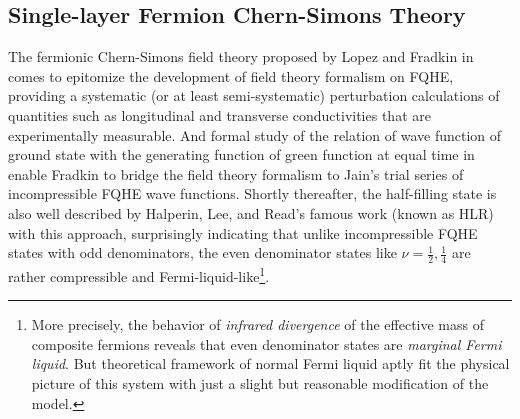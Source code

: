 \documentclass[bachelor,english,numbers]{ustcthesis}
\begin{document}
		\subsection{Single-layer Fermion Chern-Simons Theory}
		\indent\par The fermionic Chern-Simons field theory proposed by Lopez and Fradkin in \cite{lopez1991fractional} comes to epitomize the development of field theory formalism on FQHE, providing a systematic (or at least semi-systematic) perturbation calculations of quantities such as longitudinal and transverse conductivities that are experimentally measurable. And formal study of the relation of wave function of ground state with the generating function of green function at equal time in \cite{fradkin1993wave} enable Fradkin to bridge the field theory formalism to Jain's trial series of incompressible FQHE wave functions. Shortly thereafter, the half-filling state is also well described by Halperin, Lee, and Read's famous work \cite{Halperin1995Theory} (known as HLR) with this approach, surprisingly indicating that unlike incompressible FQHE states with odd denominators, the even denominator states like $\nu=\frac{1}{2},\frac{1}{4}$ are rather compressible and Fermi-liquid-like\footnote{More precisely, the behavior of \emph{infrared divergence} of the effective mass of composite fermions \cite{stern1995singularities} reveals that even denominator states are \emph{marginal Fermi liquid}. But theoretical framework of normal Fermi liquid aptly fit the physical picture of this system with just a slight but reasonable modification of the model.}.
\end{document}
